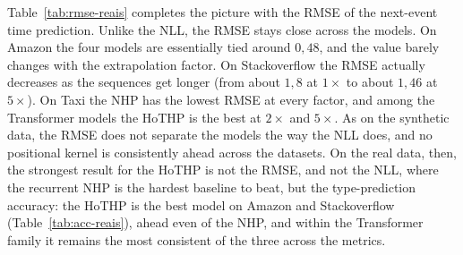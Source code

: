 Table~\ref{tab:rmse-reais} completes the picture with the RMSE of the next-event time prediction. Unlike the NLL, the RMSE stays close across the models. On Amazon the four models are essentially tied around $0{,}48$, and the value barely changes with the extrapolation factor. On Stackoverflow the RMSE actually decreases as the sequences get longer (from about $1{,}8$ at $1\times$ to about $1{,}46$ at $5\times$). On Taxi the NHP has the lowest RMSE at every factor, and among the Transformer models the HoTHP is the best at $2\times$ and $5\times$. As on the synthetic data, the RMSE does not separate the models the way the NLL does, and no positional kernel is consistently ahead across the datasets. On the real data, then, the strongest result for the HoTHP is not the RMSE, and not the NLL, where the recurrent NHP is the hardest baseline to beat, but the type-prediction accuracy: the HoTHP is the best model on Amazon and Stackoverflow (Table~\ref{tab:acc-reais}), ahead even of the NHP, and within the Transformer family it remains the most consistent of the three across the metrics.

